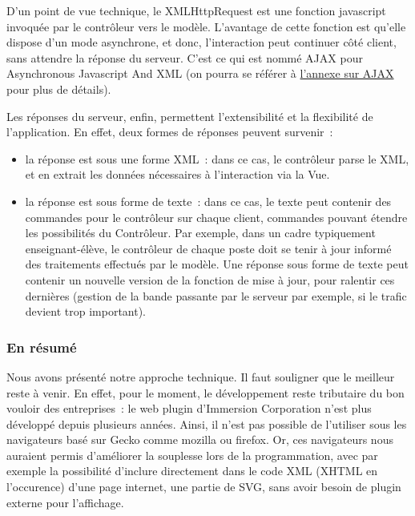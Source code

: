 \documentclass[
]{book}
\providecommand{\tightlist}{%
  \setlength{\itemsep}{0pt}\setlength{\parskip}{0pt}}
\begin{document}
D'un point de vue technique, le XMLHttpRequest est une fonction javascript
invoquée par le contrôleur vers le modèle. L'avantage de cette fonction est
qu'elle dispose d'un mode asynchrone, et donc, l'interaction peut continuer
côté client, sans attendre la réponse du serveur. C'est ce qui est nommé AJAX
pour Asynchronous Javascript And XML (on pourra se référer
à \protect\hyperlink{ajax}{l'annexe sur AJAX} pour plus de détails).

Les réponses du serveur, enfin, permettent l'extensibilité et la
flexibilité de l'application. En effet, deux formes de réponses peuvent
survenir~:

\begin{itemize}
\tightlist
\item
  la réponse est sous une forme XML~: dans ce cas, le
  contrôleur parse le XML, et en extrait les données nécessaires à
  l'interaction via la Vue.
\item
  la réponse est sous forme de texte~: dans ce cas, le
  texte peut contenir des commandes pour le contrôleur sur chaque client,
  commandes pouvant étendre les possibilités du Contrôleur. Par exemple, dans
  un cadre typiquement enseignant-élève, le contrôleur de chaque poste doit
  se tenir à jour informé des traitements effectués par le modèle. Une
  réponse sous forme de texte peut contenir un nouvelle version de la
  fonction de mise à jour, pour ralentir ces dernières (gestion de la bande
  passante par le serveur par exemple, si le trafic devient trop
  important).
\end{itemize}

\hypertarget{en-ruxe9sumuxe9-1}{%
\subsubsection{En résumé}\label{en-ruxe9sumuxe9-1}}

Nous avons présenté notre approche technique. Il faut souligner que le
meilleur reste à venir. En effet, pour le moment, le développement reste
tributaire du bon vouloir des entreprises~: le web plugin d'Immersion
Corporation n'est plus développé depuis plusieurs années. Ainsi, il n'est pas
possible de l'utiliser sous les navigateurs basé sur Gecko comme mozilla ou
firefox. Or, ces navigateurs nous auraient permis d'améliorer la souplesse
lors de la programmation, avec par exemple la possibilité d'inclure
directement dans le code XML (XHTML en l'occurence) d'une page internet, une
partie de SVG, sans avoir besoin de plugin externe pour l'affichage.
\end{document}
